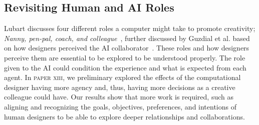 




\subsection{Revisiting Human and AI Roles}

Lubart discusses four different roles a computer might take to promote creativity; \emph{Nanny, pen-pal, coach, and colleague}~\cite{lubart_how_2005}, further discussed by Guzdial et al. based on how designers perceived the AI collaborator~\cite{guzdial_friend_2019}. These roles and how designers perceive them are essential to be explored to be understood properly. The role given to the AI could condition the experience and what is expected from each agent. In \textsc{paper xiii}, we preliminary explored the effects of the computational designer having more agency and, thus, having more decisions as a creative colleague could have. Our results show that more work is required, such as aligning and recognizing the goals, objectives, preferences, and intentions of human designers to be able to explore deeper relationships and collaborations.

